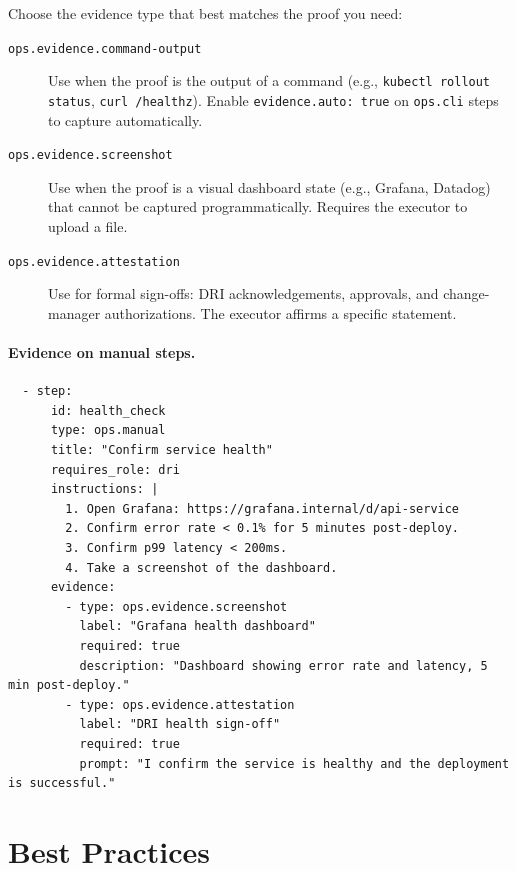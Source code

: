 Choose the evidence type that best matches the proof you need:

\begin{description}
  \item[\texttt{ops.evidence.command-output}] Use when the proof is the output of a command
    (e.g., \texttt{kubectl rollout status}, \texttt{curl /healthz}). Enable
    \texttt{evidence.auto: true} on \texttt{ops.cli} steps to capture automatically.
  \item[\texttt{ops.evidence.screenshot}] Use when the proof is a visual dashboard state
    (e.g., Grafana, Datadog) that cannot be captured programmatically. Requires the executor
    to upload a file.
  \item[\texttt{ops.evidence.attestation}] Use for formal sign-offs: DRI acknowledgements,
    approvals, and change-manager authorizations. The executor affirms a specific statement.
\end{description}

\paragraph{Evidence on manual steps.}
\begin{verbatim}
  - step:
      id: health_check
      type: ops.manual
      title: "Confirm service health"
      requires_role: dri
      instructions: |
        1. Open Grafana: https://grafana.internal/d/api-service
        2. Confirm error rate < 0.1% for 5 minutes post-deploy.
        3. Confirm p99 latency < 200ms.
        4. Take a screenshot of the dashboard.
      evidence:
        - type: ops.evidence.screenshot
          label: "Grafana health dashboard"
          required: true
          description: "Dashboard showing error rate and latency, 5 min post-deploy."
        - type: ops.evidence.attestation
          label: "DRI health sign-off"
          required: true
          prompt: "I confirm the service is healthy and the deployment is successful."
\end{verbatim}

\section{Best Practices}
\label{sec:authoring-best-practices}

